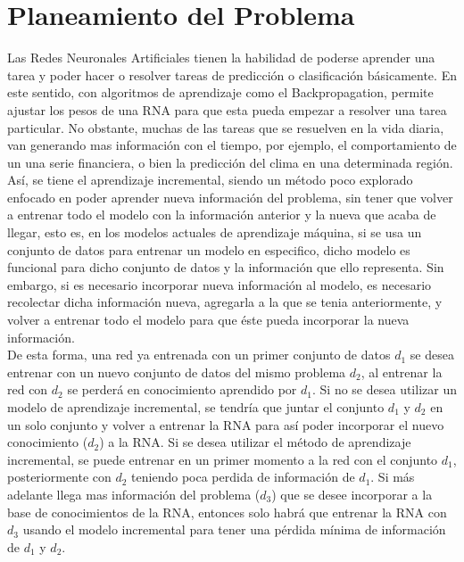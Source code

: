 \chapter{Planeamiento del Problema}
	
	
    Las Redes Neuronales Artificiales tienen la habilidad de poderse aprender una tarea 
    y poder hacer o resolver tareas de predicción o clasificación básicamente. En este 
    sentido, con algoritmos de aprendizaje como el Backpropagation, permite ajustar los 
    pesos de una RNA para que esta pueda empezar a resolver una tarea particular.  No 
    obstante, muchas de las tareas que se resuelven en la vida diaria, van generando mas 
    información con el tiempo, por ejemplo, el comportamiento de un una serie financiera, 
    o bien la predicción del clima en una determinada región. Así,  se tiene el aprendizaje 
    incremental, siendo un método poco explorado  enfocado en poder aprender nueva información del 
    problema, sin tener que volver a entrenar todo el modelo con la información anterior y la 
    nueva que acaba de llegar, esto es, en los modelos actuales de aprendizaje máquina, si se usa 
    un conjunto de datos para entrenar un modelo en especifico, dicho modelo es funcional para 
    dicho conjunto de datos y la información que ello representa. Sin embargo, si es necesario 
    incorporar nueva información al modelo, es necesario recolectar dicha información nueva, 
    agregarla a la que se tenia anteriormente, y volver a entrenar todo el modelo para que \'este 
    pueda incorporar la nueva información.\\

    De esta forma, una red ya entrenada con un primer conjunto de datos $d_{1}$ se desea entrenar 
    con un nuevo conjunto de datos del mismo problema $d_{2}$, al entrenar la red con $d_{2}$ se 
    perderá en conocimiento aprendido por $d_{1}$.  Si no se desea utilizar un modelo de aprendizaje 
    incremental, se tendría que juntar el conjunto $d_{1}$ y $d_{2}$ en un solo conjunto y volver a 
    entrenar la RNA para así poder incorporar el nuevo conocimiento ($d_{2}$) a la RNA. Si se desea 
    utilizar el método de aprendizaje incremental, se puede entrenar en un primer momento a la red 
    con el conjunto $d_{1}$, posteriormente con $d_{2}$ teniendo poca perdida de información de $d_{1}$. 
    Si más adelante llega mas información del problema ($d_{3}$) que se desee incorporar a la base 
    de conocimientos de la RNA, entonces solo habrá que entrenar la RNA con $d_{3}$ usando el modelo 
    incremental para tener una p\'erdida mínima de información de $d_{1}$ y $d_{2}$. \\

